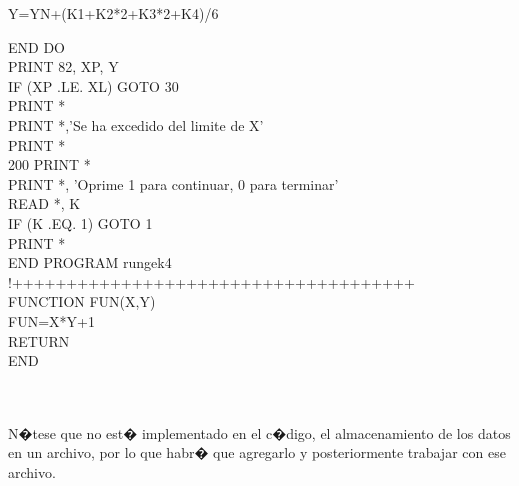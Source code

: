 \documentclass[11pt]{article}
\begin{document}
{\begin{tabbing}
\> Y=YN+(K1+K2*2+K3*2+K4)/6 \\
\end{tabbing}
END DO \\
PRINT 82, XP, Y \\
IF (XP .LE. XL) GOTO 30 \\
PRINT * \\
PRINT *,'Se ha excedido del limite de X' \\
PRINT * \\
200 PRINT * \\
PRINT *, 'Oprime 1 para continuar, 0 para terminar' \\
READ *, K \\
IF (K .EQ. 1) GOTO 1 \\
PRINT * \\
END PROGRAM rungek4 \\
!+++++++++++++++++++++++++++++++++++++ \\
FUNCTION FUN(X,Y) \\
FUN=X*Y+1 \\
RETURN \\
END 
}\\
\\
N�tese que no est� implementado en el c�digo, el almacenamiento de los datos en un archivo, por lo que habr� que agregarlo y posteriormente trabajar con ese archivo.
\end{document}
